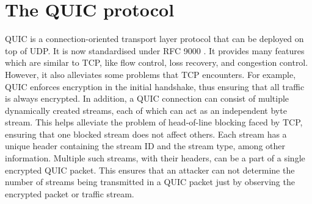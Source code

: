 \section{The QUIC protocol}
\label{sec:quic}

QUIC is a connection-oriented transport layer protocol that can be deployed on top of UDP.
It is now standardised under RFC 9000 \cite{quic_rfc}.
It provides many features which are similar to TCP, like flow control, loss recovery, and congestion control. 
However, it also alleviates some problems that TCP encounters.
For example, QUIC enforces encryption in the initial handshake, thus ensuring that all traffic is always encrypted.
In addition, a QUIC connection can consist of multiple dynamically created streams, each of which can act as an independent byte stream. 
This helps alleviate the problem of head-of-line blocking faced by TCP, ensuring that one blocked stream does not affect others.
Each stream has a unique header containing the stream ID and the stream type, among other information.
Multiple such streams, with their headers, can be a part of a single encrypted QUIC packet.
This ensures that an attacker can not determine the number of streams being transmitted in a QUIC packet just by observing the encrypted packet or traffic stream.


\endinput

\footnote{While QUIC has a PADDING frame, we don't use it, as a packet that only contains padding frames will not be re-transmitted in case of packet loss, thus revealing that it was a dummy packet.}

